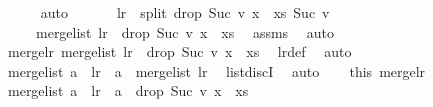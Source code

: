 \begin{isabellebody}
\ \ \ \ \isamarkupfalse%
\ auto\isanewline
\ \ \isamarkupfalse%
\ \isamarkupfalse%
\ {\isachardoublequoteopen}\ l{\isacharunderscore}{\kern0pt}r\ {\isacharequal}{\kern0pt}\ split\ {\isacharparenleft}{\kern0pt}drop\ {\isacharparenleft}{\kern0pt}Suc\ v{\isacharparenright}{\kern0pt}\ {\isacharparenleft}{\kern0pt}x\ {\isacharhash}{\kern0pt}\ xs{\isacharparenright}{\kern0pt}{\isacharparenright}{\kern0pt}\ {\isacharparenleft}{\kern0pt}Suc\ v{\isacharparenright}{\kern0pt}\ \isanewline
\ \ \ \ {\isasymLongrightarrow}\ merge{\isacharunderscore}{\kern0pt}list\ l{\isacharunderscore}{\kern0pt}r\ {\isacharequal}{\kern0pt}\ drop\ {\isacharparenleft}{\kern0pt}Suc\ v{\isacharparenright}{\kern0pt}\ {\isacharparenleft}{\kern0pt}x\ {\isacharhash}{\kern0pt}\ xs{\isacharparenright}{\kern0pt}{\isachardoublequoteclose}\ \isamarkupfalse%
\ assms{\isacharparenleft}{\kern0pt}{}{\isacharparenright}{\kern0pt}\ \isamarkupfalse%
\ auto\isanewline
\ \ \isamarkupfalse%
\ \isamarkupfalse%
\ merge{\isacharunderscore}{\kern0pt}l{\isacharunderscore}{\kern0pt}r{\isacharcolon}{\kern0pt}\ {\isachardoublequoteopen}merge{\isacharunderscore}{\kern0pt}list\ l{\isacharunderscore}{\kern0pt}r\ {\isacharequal}{\kern0pt}\ drop\ {\isacharparenleft}{\kern0pt}Suc\ v{\isacharparenright}{\kern0pt}\ {\isacharparenleft}{\kern0pt}x\ {\isacharhash}{\kern0pt}\ xs{\isacharparenright}{\kern0pt}{\isachardoublequoteclose}\ \isamarkupfalse%
\ l{\isacharunderscore}{\kern0pt}r{\isacharunderscore}{\kern0pt}def\ \isamarkupfalse%
\ auto\isanewline
\isanewline
\ \ \isamarkupfalse%
\ {\isachardoublequoteopen}merge{\isacharunderscore}{\kern0pt}list\ {\isacharparenleft}{\kern0pt}a\ {\isacharhash}{\kern0pt}\ l{\isacharunderscore}{\kern0pt}r{\isacharparenright}{\kern0pt}\ {\isacharequal}{\kern0pt}\ a\ {\isacharat}{\kern0pt}\ merge{\isacharunderscore}{\kern0pt}list\ l{\isacharunderscore}{\kern0pt}r{\isachardoublequoteclose}\ \isamarkupfalse%
\ list{\isachardot}{\kern0pt}discI\ \isamarkupfalse%
\ auto\isanewline
\ \ \isamarkupfalse%
\ this\ merge{\isacharunderscore}{\kern0pt}l{\isacharunderscore}{\kern0pt}r\ \isanewline
\ \ \isamarkupfalse%
\ {\isachardoublequoteopen}merge{\isacharunderscore}{\kern0pt}list\ {\isacharparenleft}{\kern0pt}a\ {\isacharhash}{\kern0pt}\ l{\isacharunderscore}{\kern0pt}r{\isacharparenright}{\kern0pt}\ {\isacharequal}{\kern0pt}\ a\ {\isacharat}{\kern0pt}\ {\isacharparenleft}{\kern0pt}drop\ {\isacharparenleft}{\kern0pt}Suc\ v{\isacharparenright}{\kern0pt}\ {\isacharparenleft}{\kern0pt}x\ {\isacharhash}{\kern0pt}\ xs{\isacharparenright}{\kern0pt}{\isacharparenright}{\kern0pt}{\isachardoublequoteclose}\ \isamarkupfalse%

\end{isabellebody}
